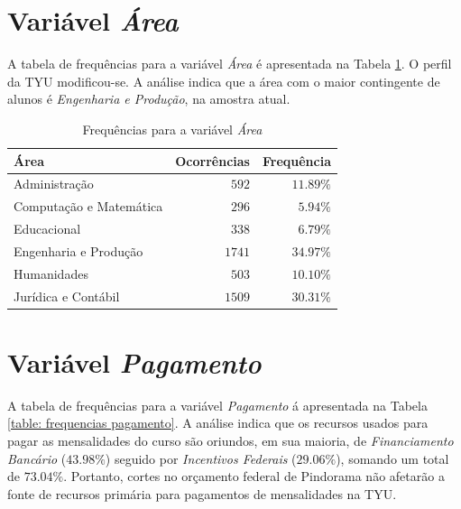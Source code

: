\documentclass[10pt,a4paper,oneside]{article}
\newcommand{\adm}{Administração\xspace}
\newcommand{\comp}{Computação e Matemática\xspace}
\newcommand{\edu}{Educacional\xspace}
\newcommand{\eng}{Engenharia e Produção\xspace}
\newcommand{\hum}{Humanidades\xspace}
\newcommand{\jur}{Jurídica e Contábil\xspace}
\begin{document}
\section{Variável \textit{Área}}
\label{section:area}

A tabela de frequências para a variável \textit{Área} é apresentada na Tabela \ref{table: frequencias area}. O perfil da TYU modificou-se. A análise indica que a área com o maior contingente de alunos é \textit{\eng}, na amostra atual.

\begin{table}[h]
\footnotesize
\centering
\caption{Frequências para a variável \textit{Área}}
\label{table: frequencias area}
\vspace{0.5em}
\begin{tabular}{l r r}
	\toprule
	\textbf{Área} & \textbf{Ocorrências} & \textbf{Frequência} \\
	\midrule
	\adm            & $592$                & $11.89\%$           \\
	\comp           & $296$                & $5.94\%$            \\
	\edu            & $338$                & $6.79\%$            \\
	\eng            & $1741$               & $34.97\%$           \\
	\hum            & $503$                & $10.10\%$           \\
	\jur            & $1509$               & $30.31\%$           \\
	\bottomrule
\end{tabular}
\end{table}

\section{Variável \textit{Pagamento}}
\label{section:pagamento}

A tabela de frequências para a variável \textit{Pagamento} á apresentada na Tabela \ref{table: frequencias pagamento}. A análise indica que os recursos usados para pagar as mensalidades do curso são oriundos, em sua maioria, de \textit{Financiamento Bancário} ($43.98\%$) seguido por \textit{Incentivos Federais} ($29.06\%$), somando um total de $73.04\%$. Portanto, cortes no orçamento federal de Pindorama não afetarão a fonte de recursos primária para pagamentos de mensalidades na TYU.
\end{document}
